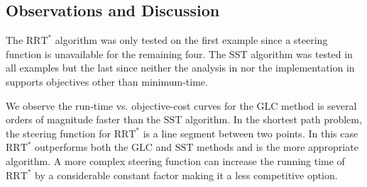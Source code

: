\documentclass{llncs}
\newcommand{\GLC}{\ensuremath{\mathrm{GLC}}\xspace}
\newcommand{\RRTs}{\ensuremath{\mathrm{RRT}^*}\xspace}
\newcommand{\SST}{\ensuremath{\mathrm{SST}}\xspace}
\begin{document}

\subsection{Observations and Discussion}
The \RRTs algorithm was only tested on the first example since a steering function is unavailable for the remaining four.
%
The \SST algorithm was tested in all examples but the last since neither the analysis in \cite{Li2016Asymptotically-} nor the implementation in \cite{BBekris2015} supports objectives other than minimum-time.
%

%
We observe the run-time vs. objective-cost curves for the \GLC method is several orders of magnitude faster than the \SST algorithm. 
%
In the shortest path problem, the steering function for \RRTs is a line segment between two points.
%
In this case \RRTs outperforms both the \GLC and \SST methods and is the more appropriate algorithm.  
%
A more complex steering function can increase the running time of \RRTs by a considerable constant factor making it a less competitive option. 
\end{document}
